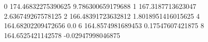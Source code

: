 0 174.46832275390625 9.786300659179688
1 167.3187713623047 2.636749267578125
2 166.48391723632812 1.8018951416015625
4 164.68202209472656 0.0
6 164.8574981689453 0.17547607421875
8 164.6525421142578 -0.02947998046875
